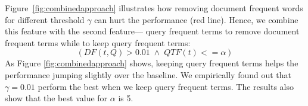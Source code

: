 Figure~\ref{fig:combinedapproach} illustrates how removing document frequent words for different threshold $\gamma$ can hurt the performance (red line). Hence, we combine this feature with the second feature--- query frequent terms to remove document frequent terms while to keep query frequent terms:
\begin{displaymath}( DF(t, Q)>0.01 \; \wedge \; QTF(t)<=\alpha )\end{displaymath}
As Figure \ref{fig:combinedapproach} shows, keeping query frequent terms helps the performance jumping slightly over the baseline. We empirically found out that $\gamma=0.01$ perform the best when we keep query frequent terms. The results also show that the best value for $\alpha$ is 5.

